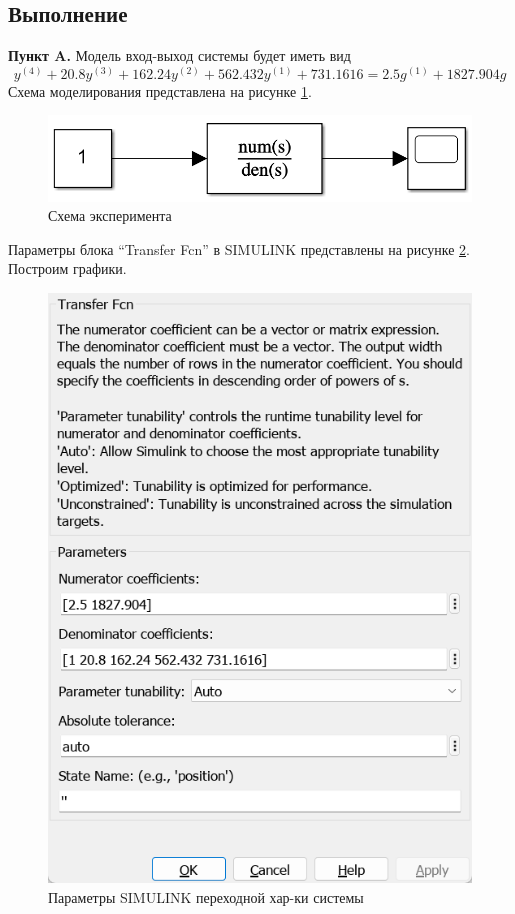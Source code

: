 \documentclass[a4paper, 12pt]{article}
\begin{document}
    \subsection{Выполнение}
    \textbf{Пункт A.} Модель вход-выход системы будет иметь вид
    $$y^{(4)}+20.8y^{(3)}+162.24y^{(2)}+562.432y^{(1)}+731.1616=2.5g^{(1)}+1827.904g$$
    Схема моделирования представлена на рисунке \ref{fig:scheme2}.
    \begin{figure}[H]
        \centering
        \includegraphics[scale=0.6]{scheme2.png}
        \captionsetup{skip=0pt}
        \caption{Схема эксперимента}
        \label{fig:scheme2}
    \end{figure}
    \noindent Параметры блока ``Transfer Fcn'' в SIMULINK представлены на рисунке \ref{fig:window2_A}. Построим графики.
    \begin{figure}[H]
        \centering
        \includegraphics[scale=0.5]{scheme2_window_A.png}
        \caption{Параметры SIMULINK переходной хар-ки системы}
        \label{fig:window2_A}
    \end{figure}
\end{document}
